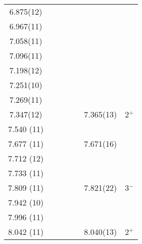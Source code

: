 \begin{center}
\begin{longtable}{cc c cc cc}
    6.875(12)   &       &                   &                   &                   &                   &                   \\
    6.967(11)   &       &                   &                   &                   &                   &                   \\
    7.058(11)   &       &                   &                   &                   &                   &                   \\
    7.096(11)   &       &                   &                   &                   &                   &                   \\
    7.198(12)   &       &                   &                   &                   &                   &                   \\
    7.251(10)   &       &                   &                   &                   &                   &                   \\
    7.269(11)   &       &                   &                   &                   &                   &                   \\
    7.347(12)   &       &                   &                   &                   &    7.365(13)      &  2$^+$            \\
  7.540 (11)    &       &                   &                   &                   &                   &                   \\
  7.677 (11)    &       &                   &                   &                   &    7.671(16)      &                   \\
  7.712 (12)    &       &                   &                   &                   &                   &                   \\
  7.733 (11)    &       &                   &                   &                   &                   &                   \\
  7.809 (11)    &       &                   &                   &                   &    7.821(22)      &  3$^-$            \\
  7.942 (10)    &       &                   &                   &                   &                   &                   \\
  7.996 (11)    &       &                   &                   &                   &                   &                   \\
  8.042 (11)    &       &                   &                   &                   &    8.040(13)      &   2$^+$           \\

\end{longtable}
\end{center}
